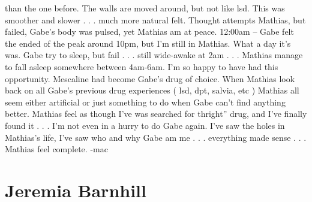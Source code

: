 \documentclass[12pt]{book}
\begin{document}
than the one before. The walls are moved around, but not like lsd. This was smoother and slower . . .  much more natural felt. Thought attempts Mathias, but failed, Gabe's body was pulsed, yet Mathias am at peace. 12:00am -- Gabe felt the ended of the peak around 10pm, but I'm still in Mathias. What a day it's was. Gabe try to sleep, but fail . . .  still wide-awake at 2am . . .  Mathias manage to fall asleep somewhere between 4am-6am. I'm so happy to have had this opportunity. Mescaline had become Gabe's drug of choice. When Mathias look back on all Gabe's previous drug experiences ( lsd, dpt, salvia, etc ) Mathias all seem either artificial or just something to do when Gabe can't find anything better. Mathias feel as though I've was searched for thright'' drug, and I've finally found it . . .  I'm not even in a hurry to do Gabe again. I've saw the holes in Mathias's life, I've saw who and why Gabe am me . . .  everything made sense . . .  Mathias feel complete. -mac






\chapter{Jeremia Barnhill}
\end{document}
